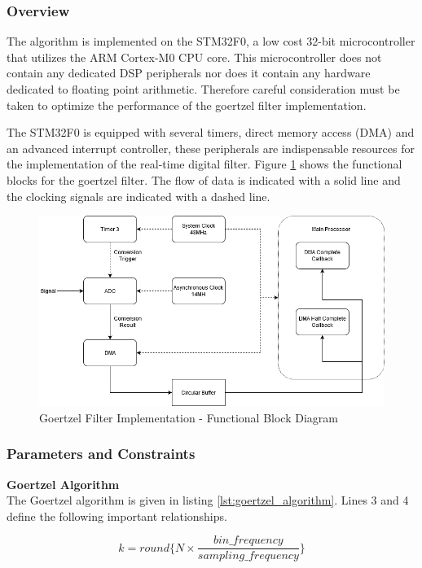 \subsubsection{Overview}
The algorithm is implemented on the STM32F0, a low cost 32-bit microcontroller that utilizes the ARM Cortex-M0 CPU core. This microcontroller does not contain any dedicated DSP peripherals nor does it contain any hardware dedicated to floating point arithmetic. Therefore careful consideration must be taken to optimize the performance of the goertzel filter implementation.

The STM32F0 is equipped with several timers, direct memory access (DMA) and an advanced interrupt controller, these peripherals are indispensable resources for the implementation of the real-time digital filter. Figure \ref{fig:goertzel_functional_diagram} shows the functional blocks for the goertzel filter. The flow of data is indicated with a solid line and the clocking signals are indicated with a dashed line.

\begin{figure}[H]
	\centering
	\includegraphics[width=.8\textwidth]{figures/design/goertzel_filter_functional.png}
	\caption{Goertzel Filter Implementation - Functional Block Diagram}
	\label{fig:goertzel_functional_diagram}
\end{figure}

\subsubsection{Parameters and Constraints}

\textbf{Goertzel Algorithm}\\
The Goertzel algorithm is given in listing \ref{lst:goertzel_algorithm}. Lines 3 and 4 define the following important relationships.

\begin{equation}
	k = round\{N \times \frac{bin\_frequency}{sampling\_frequency}\}
	\label{eqn:bin_number}
\end{equation}

